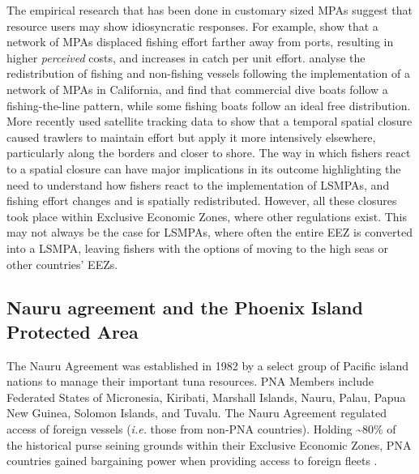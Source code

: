 \documentclass[11pt,]{article}
\begin{document}
The empirical research that has been done in customary sized MPAs
suggest that resource users may show idiosyncratic responses. For
example, \citet{stevenson_2013} show that a network of MPAs displaced
fishing effort farther away from ports, resulting in higher
\emph{perceived} costs, and increases in catch per unit effort.
\citet{cabral_2017} analyse the redistribution of fishing and
non-fishing vessels following the implementation of a network of MPAs in
California, and find that commercial dive boats follow a
fishing-the-line pattern, while some fishing boats follow an ideal free
distribution. More recently \citet{elahi_2018} used satellite tracking
data to show that a temporal spatial closure caused trawlers to maintain
effort but apply it more intensively elsewhere, particularly along the
borders and closer to shore. The way in which fishers react to a spatial
closure can have major implications in its outcome
\citep{smith_2003,hilborn_2006} highlighting the need to understand how
fishers react to the implementation of LSMPAs, and fishing effort
changes and is spatially redistributed. However, all these closures took
place within Exclusive Economic Zones, where other regulations exist.
This may not always be the case for LSMPAs, where often the entire EEZ
is converted into a LSMPA, leaving fishers with the options of moving to
the high seas or other countries' EEZs.

\hypertarget{nauru-agreement-and-the-phoenix-island-protected-area}{%
\subsection{Nauru agreement and the Phoenix Island Protected
Area}\label{nauru-agreement-and-the-phoenix-island-protected-area}}

The Nauru Agreement was established in 1982 by a select group of Pacific
island nations to manage their important tuna resources. PNA Members
include Federated States of Micronesia, Kiribati, Marshall Islands,
Nauru, Palau, Papua New Guinea, Solomon Islands, and Tuvalu. The Nauru
Agreement regulated access of foreign vessels (\emph{i.e.} those from
non-PNA countries). Holding \textasciitilde{}80\% of the historical
purse seining grounds within their Exclusive Economic Zones, PNA
countries gained bargaining power when providing access to foreign
fleets \citep{havice_2010}.
\end{document}
